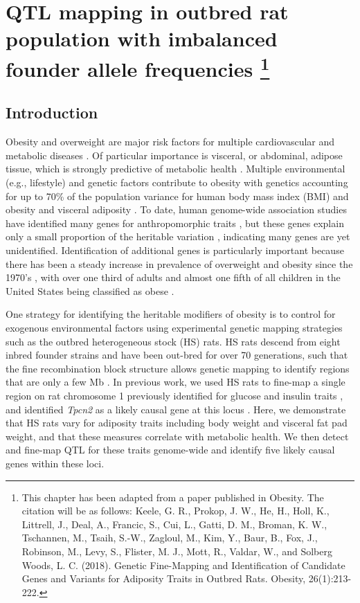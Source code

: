 \chapter[QTL mapping in outbred rat population with imbalanced founder allele frequencies]{QTL mapping in outbred rat population with imbalanced \\ founder allele frequencies
\footnote{This chapter has been adapted from a paper published in Obesity. The citation will be as follows: Keele, G. R., Prokop, J. W., He, H., Holl, K., Littrell, J., Deal, A., Francic, S., Cui, L., Gatti, D. M., Broman, K. W., Tschannen, M., Tsaih, S.-W., Zagloul, M., Kim, Y., Baur, B., Fox, J., Robinson, M., Levy, S., Flister, M. J., Mott, R., Valdar, W., and Solberg Woods, L. C. (2018). Genetic Fine-Mapping and Identification of Candidate Genes and Variants for Adiposity Traits in Outbred Rats. Obesity, 26(1):213-222.}}
\label{chap:hs_rats}

\section{Introduction}

Obesity and overweight are major risk factors for multiple cardiovascular and metabolic diseases \citep{Wang2009}. Of particular importance is visceral, or abdominal, adipose tissue, which is strongly predictive of metabolic health \citep{Emdin2017a}.  Multiple environmental (e.g., lifestyle) and genetic factors contribute to obesity with genetics accounting for up to 70\% of the population variance for human body mass index (BMI) and obesity \citep{Stunkard1986} and visceral adiposity \citep{Katzmarzyk2000}. To date, human genome-wide association studies have identified many genes for anthropomorphic traits \citep{Locke2015, Lu2016, Ng2017, Speliotes2010}, but these genes explain only a small proportion of the heritable variation \citep{Locke2015}, indicating many genes are yet unidentified. Identification of additional genes is particularly important because there has been a steady increase in prevalence of overweight and obesity since the 1970's \citep{Wang2009}, with over one third of adults and almost one fifth of all children in the United States being classified as obese \citep{Flegal2016}.   

One strategy for identifying the heritable modifiers of obesity is to control for exogenous environmental factors using experimental genetic mapping strategies such as the outbred heterogeneous stock (HS) rats. HS rats descend from eight inbred founder strains and have been out-bred for over 70 generations, such that the fine recombination block structure allows genetic mapping to identify regions that are only a few Mb \citep{SolbergWoods2014}. In previous work, we used HS rats to fine-map a single region on rat chromosome 1 previously identified for glucose and insulin traits \citep{SolbergWoods2010, SolbergWoods2012}, and identified \textit{Tpcn2} as a likely causal gene at this locus \citep{Tsaih2014}. Here, we demonstrate that HS rats vary for adiposity traits including body weight and visceral fat pad weight, and that these measures correlate with metabolic health. We then detect and fine-map QTL for these traits genome-wide and identify five likely causal genes within these loci.

